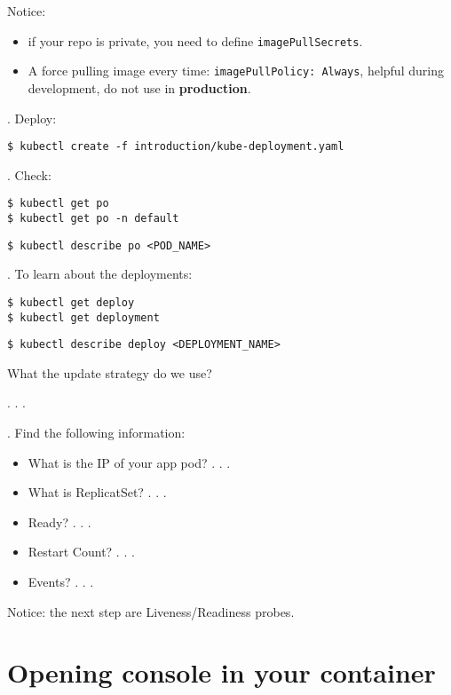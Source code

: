 \documentclass[12pt, letterpaper]{article}
\begin{document}
Notice:
\begin{itemize}
\item if your repo is private, you need to define \verb|imagePullSecrets|.
\item A force pulling image every time: \verb|imagePullPolicy: Always|, helpful during development, do not use in \textbf{production}.
\end{itemize}

. Deploy:

\begin{verbatim}
$ kubectl create -f introduction/kube-deployment.yaml
\end{verbatim}

. Check:

\begin{verbatim}
$ kubectl get po
$ kubectl get po -n default
\end{verbatim}

\begin{verbatim}
$ kubectl describe po <POD_NAME>
\end{verbatim}

. To learn about the deployments:

\begin{verbatim}
$ kubectl get deploy
$ kubectl get deployment
\end{verbatim}

\begin{verbatim}
$ kubectl describe deploy <DEPLOYMENT_NAME>
\end{verbatim}

What the update strategy do we use?

   . . .

. Find the following information:
\begin{itemize}
    \item What is the IP of your app pod? . . .
    \item What is ReplicatSet? . . .
    \item Ready? . . .
    \item Restart Count? . . .
    \item Events? . . .
\end{itemize}

Notice: the next step are Liveness/Readiness probes.

%
%
%
\pagebreak
\section{Opening console in your container}
\end{document}
